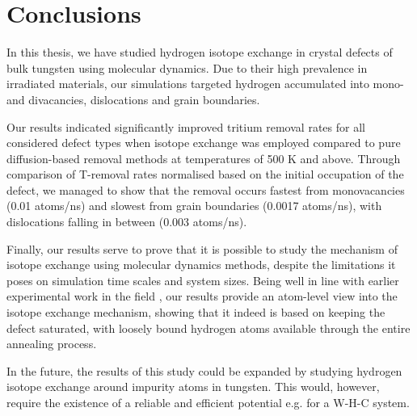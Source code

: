\chapter{Conclusions}

In this thesis, we have studied hydrogen isotope exchange in crystal defects of bulk tungsten using molecular dynamics. 
Due to their high prevalence in irradiated materials, our simulations targeted hydrogen accumulated into mono- and divacancies, dislocations and grain boundaries.  

Our results indicated significantly improved tritium removal rates for all considered defect types when isotope exchange was employed compared to pure diffusion-based removal methods at temperatures of 500 K and above.
Through comparison of T-removal rates normalised based on the initial occupation of the defect, we managed to show that the removal occurs fastest from monovacancies (0.01 atoms/ns) and slowest from grain boundaries (0.0017 atoms/ns), with dislocations falling in between (0.003 atoms/ns).

Finally, our results serve to prove that it is possible to study the mechanism of isotope exchange using molecular dynamics methods, despite the limitations it poses on simulation time scales and system sizes.
Being well in line with earlier experimental work in the field \cite{ahlgren2019hydrogen}, our results provide an atom-level view into the isotope exchange mechanism, showing that it indeed is based on keeping the defect saturated, with loosely bound hydrogen atoms available through the entire annealing process.

In the future, the results of this study could be expanded by studying hydrogen isotope exchange around impurity atoms in tungsten.
This would, however, require the existence of a reliable and efficient potential e.g. for a W-H-C system.   
